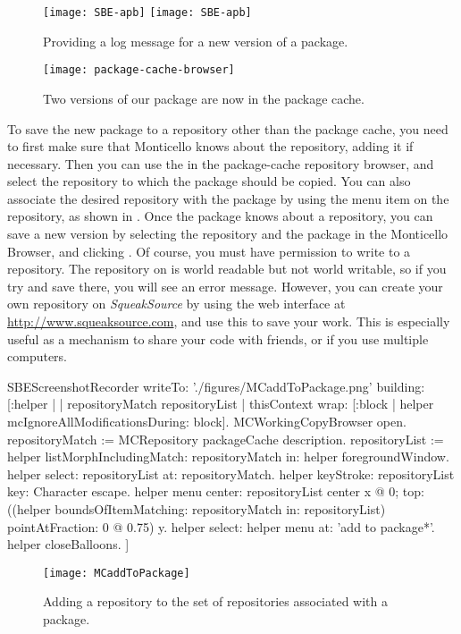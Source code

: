 \documentclass[a4paper,10pt,twoside]{book}
\begin{document}
\begin{figure}[tbp]
	\begin{center}
	\ifluluelse
		{\texttt{[image: SBE-apb]}}
		{\texttt{[image: SBE-apb]}}
	\end{center}
	\caption{Providing a log message for a new version of a package.}
	\label{fig:SBE-apb}
\end{figure}

\begin{figure}[tbp]
	\begin{center}
	\texttt{[image: package-cache-browser]}
	\end{center}
	\caption{Two versions of our package are now in the package cache.}
	\label{fig:package-cache-browser}
\end{figure}

To save the new package to a repository other than the package cache, you need to first make sure that Monticello knows about the repository, adding it if necessary.  
Then you can use the  in the package-cache repository browser, and select the repository to which the package should be copied.  
You can also associate the desired repository with the package by using the  menu item  on the repository, as shown in .  
Once the package knows about a repository, you can save a new version by selecting the repository and the package in the Monticello Browser, and clicking .  
Of course, you must have permission to write to a repository.  
The  repository on  is world readable but not world writable, so if you try and save there, you will see an error message.  
However, you can create your own repository on \emph{SqueakSource} by using the web interface at \url{http://www.squeaksource.com}, and use this to save your work. 
This is especially useful as a mechanism to share your code with friends, or if you use multiple computers.

\begin{ExecuteSmalltalkScript}
SBEScreenshotRecorder writeTo: './figures/MCaddToPackage.png' building: [:helper |
	| repositoryMatch repositoryList |
	thisContext wrap: [:block | helper mcIgnoreAllModificationsDuring: block].
	MCWorkingCopyBrowser open.
	repositoryMatch := MCRepository packageCache description.
	repositoryList := helper listMorphIncludingMatch: repositoryMatch in: helper foregroundWindow.
	helper select: repositoryList at: repositoryMatch.
	helper keyStroke: repositoryList key: Character escape.
	helper menu
		center: repositoryList center x @ 0;
		top: ((helper boundsOfItemMatching: repositoryMatch in: repositoryList)
			pointAtFraction: 0 @ 0.75) y.
	helper select: helper menu at: 'add to package*'.
	helper closeBalloons.
]
\end{ExecuteSmalltalkScript}
\begin{figure}[tbp]
	\begin{center}
		\texttt{[image: MCaddToPackage]}
	\end{center}
	\caption{Adding a repository to the set of repositories associated with a package.}
	\label{fig:associateRepository}
\end{figure}
\end{document}
